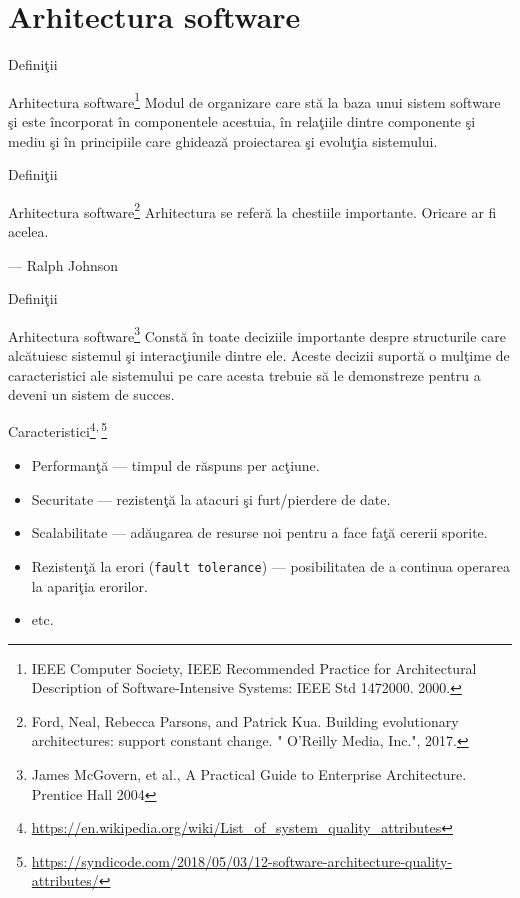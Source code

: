 \documentclass[presentation]{beamer}
\begin{document}
\section{Arhitectura software}
\label{sec:org04204a3}
\begin{frame}[label={sec:org32460c4}]{Definiţii}
\begin{block}{Arhitectura software\footnote{IEEE Computer Society, IEEE Recommended Practice for Architectural Description of Software-Intensive Systems: IEEE Std 1472000. 2000.}}
\vskip 0.1in
Modul de organizare care stă la baza unui sistem software şi este încorporat în componentele acestuia, în relaţiile dintre componente şi mediu şi în principiile care ghidează proiectarea şi evoluţia sistemului.
\end{block}
\end{frame}
\begin{frame}[label={sec:org2a64b85}]{Definiţii}
\begin{block}{Arhitectura software\footnote{Ford, Neal, Rebecca Parsons, and Patrick Kua. Building evolutionary architectures: support constant change. " O'Reilly Media, Inc.", 2017.}}
\vskip 0.1in
Arhitectura se referă la chestiile importante. Oricare ar fi acelea.

\hfill --- Ralph Johnson
\end{block}
\end{frame}
\begin{frame}[label={sec:org49fab7e}]{Definiţii}
\begin{block}{Arhitectura software\footnote{James McGovern, et al., A Practical Guide to Enterprise Architecture. Prentice Hall 2004}}
\vskip 0.1in
Constă în toate deciziile importante despre structurile care alcătuiesc sistemul şi interacţiunile dintre ele. Aceste decizii suportă o mulţime de caracteristici ale sistemului pe care acesta trebuie să le demonstreze pentru a deveni un sistem de succes.
\end{block}
\end{frame}
\begin{frame}[label={sec:orgce9f05a},fragile]{Caracteristici\footnote{\url{https://en.wikipedia.org/wiki/List\_of\_system\_quality\_attributes}}\textsuperscript{,}\,\footnote{\url{https://syndicode.com/2018/05/03/12-software-architecture-quality-attributes/}}}
 \begin{itemize}
\item \alert{Performanţă} --- timpul de răspuns per acţiune.
\item \alert{Securitate} --- rezistenţă la atacuri şi furt/pierdere de date.
\item \alert{Scalabilitate} --- adăugarea de resurse noi pentru a face faţă cererii sporite.
\item \alert{Rezistenţă la erori} (\texttt{fault tolerance}) --- posibilitatea de a continua operarea la apariţia erorilor.
\item etc.
\end{itemize}
\end{frame}
\end{document}
